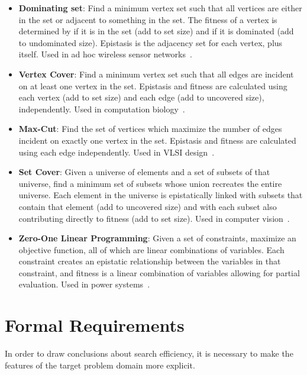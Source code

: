 \begin{itemize}
\item \textbf{Dominating set}: Find a minimum vertex
set such that all vertices are either in the set or adjacent to something in the set.
The fitness of a vertex is determined by if it is in the set (add to set size) and if
it is dominated (add to undominated size). Epistasis is the adjacency set for each
vertex, plus itself. Used in ad hoc wireless sensor networks~\cite{todo-dominating-set}.

\item \textbf{Vertex Cover}: Find a minimum vertex
set such that all edges are incident on at least one vertex in the set.
Epistasis and fitness are calculated using each vertex (add to set size)
and each edge (add to uncovered size), independently. Used in computation biology~\cite{todo-vertex-cover}.

\item \textbf{Max-Cut}: Find the set of vertices which maximize the number of edges
incident on exactly one vertex in the set. Epistasis and fitness are calculated
using each edge independently. Used in VLSI design~\cite{todo-max-cut}.

\item \textbf{Set Cover}: Given a universe of elements and a set of subsets of that universe,
find a minimum set of subsets whose union recreates the entire universe. Each element in
the universe is epistatically linked with subsets that contain that element (add to uncovered size)
and with each subset also contributing directly to fitness (add to set size). Used in
computer vision~\cite{todo-set-cover}.

\item \textbf{Zero-One Linear Programming}: Given a set of constraints, maximize an
objective function, all of which are linear combinations of variables. Each constraint
creates an epistatic relationship between the variables in that constraint, and fitness
is a linear combination of variables allowing for partial evaluation. Used in power systems~\cite{todo-linear-programming}.
\end{itemize}

\section{Formal Requirements}
In order to draw conclusions about search efficiency, it is necessary to make the features
of the target problem domain more explicit.

